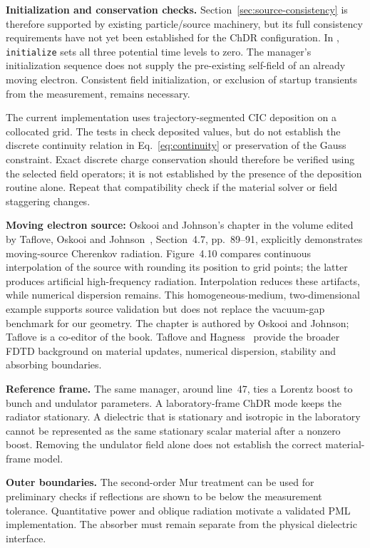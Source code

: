 \documentclass[11pt,a4paper]{article}
\newcommand{\code}[1]{\texttt{\small #1}}
\numberwithin{equation}{section}
\begin{document}
\textbf{Initialization and conservation checks.}
Section~\ref{sec:source-consistency} is therefore supported by existing
particle/source machinery, but its full consistency requirements have
not yet been established for the ChDR configuration.
In ,
\code{initialize} sets all three potential time levels to zero.
The manager's initialization sequence does not supply the pre-existing
self-field of an already moving electron. Consistent field initialization,
or exclusion of startup transients from the measurement, remains necessary.

The current implementation uses trajectory-segmented CIC deposition on
a collocated grid. The tests in
 check deposited
values, but do not establish the discrete continuity relation in
Eq.~\eqref{eq:continuity} or preservation of the Gauss constraint.
Exact discrete charge conservation should therefore be verified using
the selected field operators; it is not established by the presence of
the deposition routine alone. Repeat that compatibility check if the
material solver or field staggering changes.

\textbf{Moving electron source:}
Oskooi and Johnson's chapter in the volume edited by Taflove, Oskooi and
Johnson~\cite{taflove2013advances,oskooi2013sources},
Section~4.7, pp.~89--91, explicitly demonstrates moving-source Cherenkov
radiation. Figure~4.10 compares continuous interpolation of the source
with rounding its position to grid points; the latter produces artificial
high-frequency radiation. Interpolation reduces these artifacts, while
numerical dispersion remains. This homogeneous-medium, two-dimensional
example supports source validation but does not replace the
vacuum-gap benchmark for our geometry. The chapter is authored by
Oskooi and Johnson; Taflove is a co-editor of the book.
Taflove and Hagness~\cite{taflove2005computational} provide the broader
FDTD background on material updates, numerical dispersion, stability
and absorbing boundaries.

\textbf{Reference frame.}
The same manager, around line~47, ties a Lorentz boost to bunch and
undulator parameters. A laboratory-frame ChDR mode keeps the radiator
stationary. A dielectric that is stationary and isotropic in the laboratory
cannot be represented as the same stationary scalar material after a
nonzero boost. Removing the undulator field alone does not establish
the correct material-frame model.

\textbf{Outer boundaries.}
The second-order Mur treatment can be used for preliminary checks if
reflections are shown to be below the measurement tolerance. Quantitative
power and oblique radiation motivate a validated PML implementation.
The absorber must remain separate from the physical dielectric interface.
\end{document}

